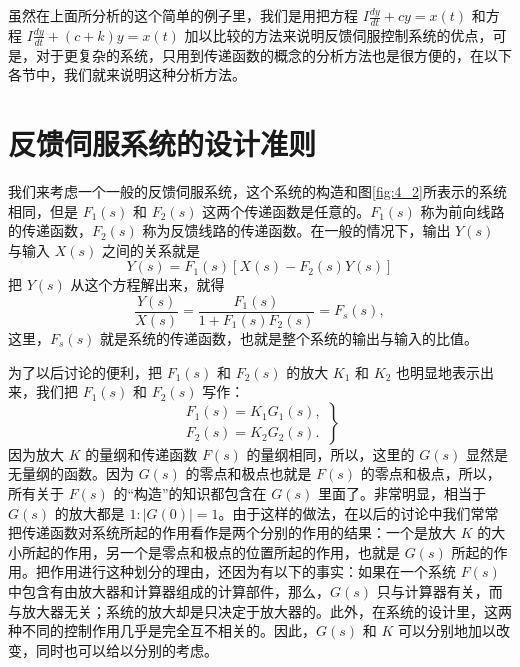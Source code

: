 虽然在上面所分析的这个简单的例子里，我们是用把方程 $I \frac{dy}{dt} + cy = x(t)$ 和方程 $I \frac{dy}{dt} + (c+k)y = x(t)$ 加以比较的方法来说明反馈伺服控制系统的优点，可是，对于更复杂的系统，只用到传递函数的概念的分析方法也是很方便的，在以下各节中，我们就来说明这种分析方法。


\section{反馈伺服系统的设计准则}\label{design_protocol_feedback_server_system}

我们来考虑一个一般的反馈伺服系统，这个系统的构造和图\ref{fig:4_2}所表示的系统相同，但是 $F_1(s)$ 和 $F_2(s)$ 这两个传递函数是任意的。$F_1(s)$ 称为前向线路的传递函数，$F_2(s)$ 称为反馈线路的传递函数。在一般的情况下，输出 $Y(s)$ 与输入 $X(s)$ 之间的关系就是
\begin{equation*}
    Y(s) = F_1(s)[X(s) - F_2(s)Y(s)]
\end{equation*}
把 $Y(s)$ 从这个方程解出来，就得
\begin{equation}\label{eq:transfer_function_of_close_system}
    \frac{Y(s)}{X(s)} = \frac{F_1(s)}{1 + F_1(s)F_2(s)} = F_s(s),
\end{equation}
这里，$F_s(s)$ 就是系统的传递函数，也就是整个系统的输出与输入的比值。

为了以后讨论的便利，把 $F_1(s)$ 和 $F_2(s)$ 的放大 $K_1$ 和 $K_2$ 也明显地表示出来，我们把 $F_1(s)$ 和 $F_2(s)$ 写作：
\begin{equation}\label{eq:transfer_function_f1_f2}
\left.
    \begin{array}{l}
        F_1(s) = K_1G_1(s), \\
        F_2(s) = K_2G_2(s).
    \end{array}
\right\}
\end{equation}
因为放大 $K$ 的量纲和传递函数 $F(s)$ 的量纲相同，所以，这里的 $G(s)$ 显然是无量纲的函数。因为 $G(s)$ 的零点和极点也就是 $F(s)$ 的零点和极点，所以，所有关于 $F(s)$ 的“构造”的知识都包含在 $G(s)$ 里面了。非常明显，相当于 $G(s)$ 的放大都是 $1:|G(0)|=1$。由于这样的做法，在以后的讨论中我们常常把传递函数对系统所起的作用看作是两个分别的作用的结果：一个是放大 $K$ 的大小所起的作用，另一个是零点和极点的位置所起的作用，也就是 $G(s)$ 所起的作用。把作用进行这种划分的理由，还因为有以下的事实：如果在一个系统 $F(s)$ 中包含有由放大器和计算器组成的计算部件，那么，$G(s)$ 只与计算器有关，而与放大器无关；系统的放大却是只决定于放大器的。此外，在系统的设计里，这两种不同的控制作用几乎是完全互不相关的。因此，$G(s)$ 和 $K$ 可以分别地加以改变，同时也可以给以分别的考虑。

